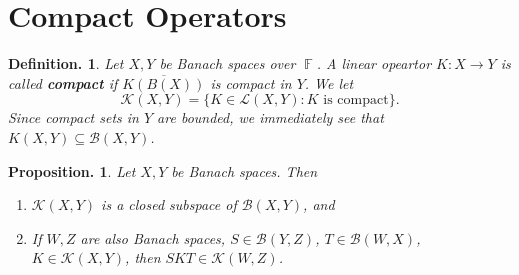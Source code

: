 \documentclass[11pt, a4paper]{memoir}
\DeclareMathOperator{\F}{{\mathbb{F}}}
\theoremstyle{change}
\newtheorem{proposition}[theorem]{Proposition.}
\theoremstyle{plain}
\theoremstyle{nonumberplain}
\newtheorem{definition}{Definition.}
\numberwithin{equation}{section}
\begin{document}
\section{Compact Operators}
\begin{definition}
    Let $X,Y$ be Banach spaces over $\F$.
    A linear opeartor $K:X\to Y$ is called \textbf{compact} if $\overline{K(B(X))}$ is compact in $Y$.
    We let
    \begin{equation*}
        \mathcal{K}(X,Y)=\{K\in\mathcal{L}(X,Y):K\text{ is compact}\}.
    \end{equation*}
    Since compact sets in $Y$ are bounded, we immediately see that $K(X,Y)\subseteq\mathcal{B}(X,Y)$.
\end{definition}
\begin{proposition}
    Let $X,Y$ be Banach spaces.
    Then
    \begin{enumerate}[nl,r]
        \item $\mathcal{K}(X,Y)$ is a closed subspace of $\mathcal{B}(X,Y)$, and
        \item If $W,Z$ are also Banach spaces, $S\in\mathcal{B}(Y,Z)$, $T\in\mathcal{B}(W,X)$, $K\in\mathcal{K}(X,Y)$, then $SKT\in\mathcal{K}(W,Z)$.
    \end{enumerate}
\end{proposition}
\end{document}
